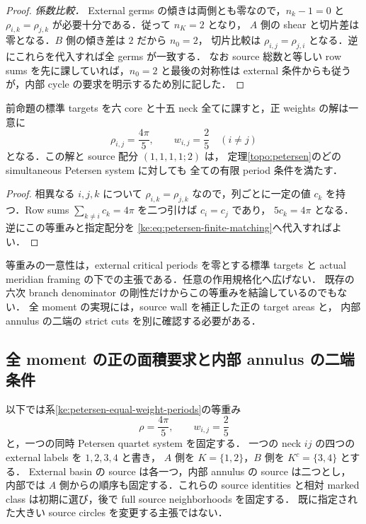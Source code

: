 \begin{proof}
\emph{係数比較．}
External germs の傾きは両側とも零なので，$n_k-1=0$ と
$\rho_{i,k}=\rho_{j,k}$ が必要十分である．従って $n_K=2$ となり，
$A$ 側の shear と切片差は零となる．$B$ 側の傾き差は $2$ だから $n_0=2$，
切片比較は $\rho_{i,j}=\rho_{j,i}$ となる．逆にこれらを代入すれば全 germs が一致する．
なお source 総数と等しい row sums を先に課していれば，$n_0=2$ と最後の対称性は
external 条件からも従うが，内部 cycle の要求を明示するため別に記した．
\end{proof}

\begin{corollary}
\label{ke:petersen-equal-weight-periods}
前命題の標準 targets を六 core と十五 neck 全てに課すと，正 weights の解は一意に
\[
 \rho_{i,j}=\frac{4\pi}{5},\qquad w_{i,j}=\frac25\quad(i\ne j)
\]
となる．この解と source 配分 $(1,1,1,1;2)$ は，
定理\ref{topo:petersen}のどの simultaneous Petersen system に対しても
全ての有限 period 条件を満たす．
\end{corollary}

\begin{proof}
相異なる $i,j,k$ について $\rho_{i,k}=\rho_{j,k}$ なので，列ごとに一定の値
$c_k$ を持つ．Row sums $\sum_{k\ne i}c_k=4\pi$ を二つ引けば $c_i=c_j$ であり，
$5c_k=4\pi$ となる．逆にこの等重みと指定配分を
\eqref{ke:eq:petersen-finite-matching}へ代入すればよい．
\end{proof}

\begin{remark}
等重みの一意性は，external critical periods を零とする標準 targets と
actual meridian framing の下での主張である．任意の作用規格化へ広げない．
既存の六次 branch denominator の剛性だけからこの等重みを結論しているのでもない．
全 moment の実現には，source wall を補正した正の target areas と，
内部 annulus の二端の strict cuts を別に確認する必要がある．
\end{remark}

\subsection{全 moment の正の面積要求と内部 annulus の二端条件}

以下では系\ref{ke:petersen-equal-weight-periods}の等重み
\[
 \rho=\frac{4\pi}{5},\qquad w_{i,j}=\frac25
\]
と，一つの同時 Petersen quartet system を固定する．
一つの neck $ij$ の四つの external labels を $1,2,3,4$ と書き，
$A$ 側を $K=\{1,2\}$，$B$ 側を $K^c=\{3,4\}$ とする．
External basin の source は各一つ，内部 annulus の source は二つとし，
内部では $A$ 側からの順序も固定する．これらの source identities と相対
marked class は初期に選び，後で full source neighborhoods を固定する．
既に指定された大きい source circles を変更する主張ではない．

